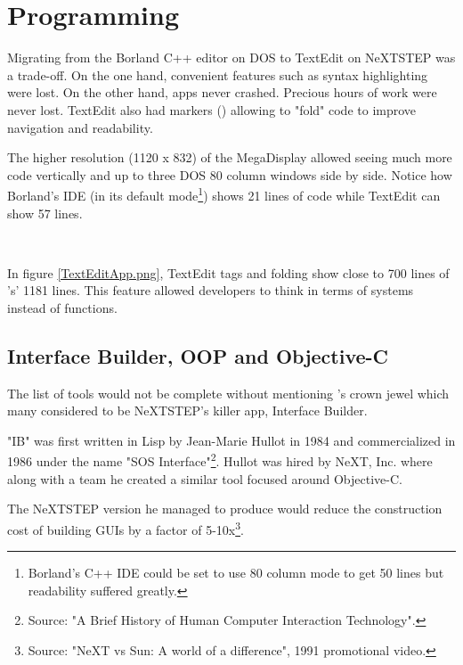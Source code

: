 \vspace{-10pt}
\section{Programming}
Migrating from the Borland C++ editor on DOS to TextEdit on NeXTSTEP was a trade-off. On the one hand, convenient features such as syntax highlighting were lost. On the other hand, apps never crashed. Precious hours of work were never lost. TextEdit also had markers (\cw{//}) allowing to "fold" code to improve navigation and readability.\\
\par
 The higher resolution (1120 x 832) of the MegaDisplay allowed seeing much more code vertically and up to three DOS 80 column windows side by side. Notice how Borland's IDE (in its default mode\footnote{Borland's C++ IDE could be set to use 80 column mode to get 50 lines but readability suffered greatly.}) shows 21 lines of code while TextEdit can show 57 lines.\\
\par
{}\\

\vspace{-4mm}


In figure \ref{TextEditApp.png}, TextEdit tags and folding show close to 700 lines of 's' 1181 lines. This feature allowed developers to think in terms of systems instead of functions.

\subsection{Interface Builder, OOP and Objective-C}
The list of tools would not be complete without mentioning \NeXTns{}'s crown jewel which many considered to be NeXTSTEP's killer app, Interface Builder.\\
\par
"IB" was first written in Lisp by Jean-Marie Hullot in 1984 and commercialized in 1986 under the name "SOS Interface"\footnote{Source: "A Brief History of Human Computer Interaction Technology".}. Hullot was hired by NeXT, Inc. where along with a team he created a similar tool focused around Objective-C.\\
\par
The NeXTSTEP version he managed to produce would reduce the construction cost of building GUIs by a factor of 5-10x\footnote{Source: "NeXT vs Sun: A world of a difference", 1991 promotional video.}.\\
\par
{}



